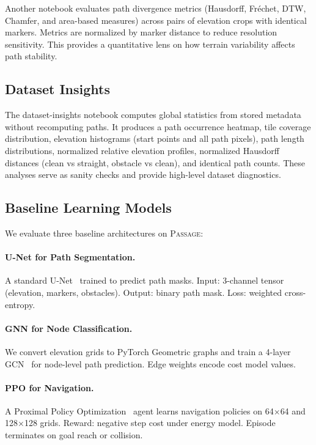 \documentclass{article}
\newcommand{\dataset}{\textsc{Passage}}
\begin{document}
Another notebook evaluates path divergence metrics (Hausdorff, Fr\'{e}chet, DTW, Chamfer, and area-based measures) across pairs of elevation crops with identical markers. Metrics are normalized by marker distance to reduce resolution sensitivity. This provides a quantitative lens on how terrain variability affects path stability.

\subsection{Dataset Insights}

The dataset-insights notebook computes global statistics from stored metadata without recomputing paths. It produces a path occurrence heatmap, tile coverage distribution, elevation histograms (start points and all path pixels), path length distributions, normalized relative elevation profiles, normalized Hausdorff distances (clean vs straight, obstacle vs clean), and identical path counts. These analyses serve as sanity checks and provide high-level dataset diagnostics.

\subsection{Baseline Learning Models}

We evaluate three baseline architectures on \dataset{}:

\paragraph{U-Net for Path Segmentation.}
A standard U-Net~\cite{ronneberger2015unet} trained to predict path masks. Input: 3-channel tensor (elevation, markers, obstacles). Output: binary path mask. Loss: weighted cross-entropy.

\paragraph{GNN for Node Classification.}
We convert elevation grids to PyTorch Geometric graphs and train a 4-layer GCN~\cite{kipf2017gcn} for node-level path prediction. Edge weights encode cost model values.

\paragraph{PPO for Navigation.}
A Proximal Policy Optimization~\cite{schulman2017ppo} agent learns navigation policies on 64$\times$64 and 128$\times$128 grids. Reward: negative step cost under energy model. Episode terminates on goal reach or collision.
\end{document}
